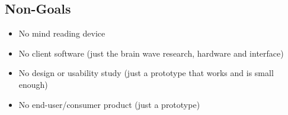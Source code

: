 \subsection{Non-Goals}
\begin{itemize}
	\item No mind reading device
	\item No client software (just the brain wave research, hardware and interface)
	\item No design or usability study (just a prototype that works and is small enough)
	\item No end-user/consumer product (just a prototype)
\end{itemize}
